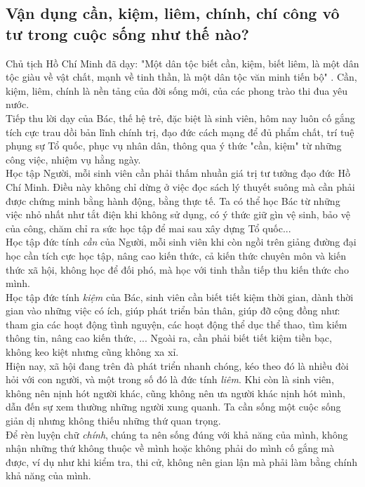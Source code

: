 \subsection{Vận dụng cần, kiệm, liêm, chính, chí công vô tư trong cuộc sống như thế nào?}
Chủ tịch Hồ Chí Minh đã dạy: "Một dân tộc biết cần, kiệm, biết liêm, là một dân tộc giàu về vật chất, mạnh về tinh thần, là một dân tộc văn minh tiến bộ" \cite{HCMtt6}. Cần, kiệm, liêm, chính là nền tảng của đời sống mới, của các phong trào thi đua yêu nước.\\
Tiếp thu lời dạy của Bác, thế hệ trẻ, đặc biệt là sinh viên, hôm nay luôn cố gắng tích cực trau dồi bản lĩnh chính trị, đạo đức cách mạng để đủ phẩm chất, trí tuệ phụng sự Tổ quốc, phục vụ nhân dân, thông qua ý thức "cần, kiệm" từ những công việc, nhiệm vụ hằng ngày. \cite{Hanh2019}\\
Học tập Người, mỗi sinh viên cần phải thấm nhuần giá trị tư tưởng đạo đức Hồ Chí Minh. Điều này không chỉ dừng ở việc đọc sách lý thuyết suông mà cần phải được chứng minh bằng hành động, bằng thực tế. Ta có thể học Bác từ những việc nhỏ nhất như tắt điện khi không sử dụng, có ý thức giữ gìn vệ sinh, bảo vệ của công, chăm chỉ ra sức học tập để mai sau xây dựng Tổ quốc... \\
Học tập đức tính \textit{cần} của Người, mỗi sinh viên khi còn ngồi trên giảng đường đại học cần tích cực học tập, nâng cao kiến thức, cả kiến thức chuyên môn và kiến thức xã hội, không học để đối phó, mà học với tinh thần tiếp thu kiến thức cho mình.\\
Học tập đức tính \textit{kiệm} của Bác, sinh viên cần biết tiết kiệm thời gian, dành thời gian vào những việc có ích, giúp phát triển bản thân, giúp đỡ cộng đồng như: tham gia các hoạt động tình nguyện, các hoạt động thể dục thể thao, tìm kiếm thông tin, nâng cao kiến thức, ... Ngoài ra, cần phải biết tiết kiệm tiền bạc, không keo kiệt nhưng cũng không xa xỉ.\\
Hiện nay, xã hội đang trên đà phát triển nhanh chóng, kéo theo đó là nhiều đòi hỏi với con người, và một trong số đó là đức tính \textit{liêm}. Khi còn là sinh viên, không nên nịnh hót người khác, cũng không nên ưa người khác nịnh hót mình, dẫn đến sự xem thường những người xung quanh. Ta cần sống một cuộc sống giản dị nhưng không thiếu những thứ quan trọng.\\
Để rèn luyện chữ \textit{chính}, chúng ta nên sống đúng với khả năng của mình, không nhận những thứ không thuộc về mình hoặc không phải do mình cố gắng mà được, ví dụ như khi kiểm tra, thi cử, không nên gian lận mà phải làm bằng chính khả năng của mình.\\
